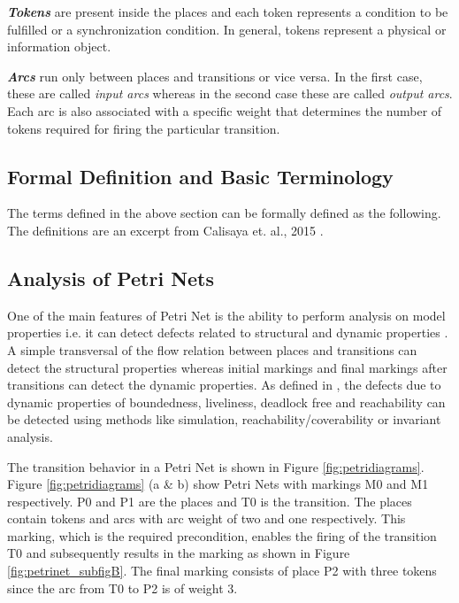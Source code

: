 \textbf{\textit{Tokens}} are present inside the places and each token represents a condition to be fulfilled or a synchronization condition. In general, tokens represent a physical or information object.

\textbf{\textit{Arcs}} run only between places and transitions or vice versa. In the first case, these are called \textit{input arcs} whereas in the second case these are called \textit{output arcs}. Each arc is also associated with a specific weight that determines the number of tokens required for firing the particular transition.

\subsection{Formal Definition and Basic Terminology}
The terms defined in the above section can be formally defined as the following. The definitions are an excerpt from Calisaya et. al., 2015 \cite{calisaya2016analysis}.

\subsection{Analysis of Petri Nets}
One of the main features of Petri Net is the ability to perform analysis on model properties i.e. it can detect defects related to structural and dynamic properties \cite{murata1989petri}. A simple transversal of the flow relation between places and transitions can detect the structural properties whereas initial markings and final markings after transitions can detect the dynamic properties. As defined in \cite{reisig2012petri}, the defects due to dynamic properties of boundedness, liveliness, deadlock free and reachability can be detected using methods like simulation, reachability/coverability or invariant analysis.

 The transition behavior in a Petri Net is shown in Figure \ref{fig:petridiagrams}. Figure \ref{fig:petridiagrams} (a \& b) show Petri Nets with markings M0 and M1 respectively.  P0 and P1 are the places and T0 is the transition. The places contain tokens and arcs with arc weight of two and one respectively. This marking, which is the required precondition, enables the firing of the transition T0 and subsequently results in the marking as shown in Figure  \ref{fig:petrinet_subfigB}.  The final marking consists of place P2 with three tokens since the arc from T0 to P2 is of weight 3. 
 
